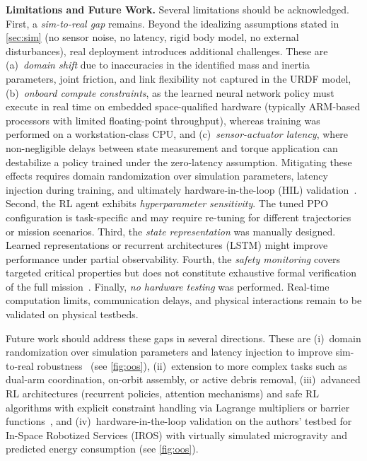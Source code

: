 \documentclass{ieeeaccess}
\begin{document}
\textbf{Limitations and Future Work.}
Several limitations should be acknowledged. First, a \emph{sim-to-real gap} remains. Beyond the idealizing assumptions
stated in \autoref{sec:sim} (no sensor noise, no latency, rigid body model, no external disturbances),
real deployment introduces additional challenges. These are (a)~\emph{domain shift} due to inaccuracies in the
identified mass and inertia parameters, joint friction, and link flexibility not captured in the
URDF model, (b)~\emph{onboard compute constraints}, as the learned neural network policy must execute in
real time on embedded space-qualified hardware (typically ARM-based processors with limited floating-point throughput), whereas
training was performed on a workstation-class CPU, and (c)~\emph{sensor-actuator latency}, where non-negligible delays between
state measurement and torque application can destabilize a policy trained under the zero-latency assumption.
Mitigating these effects requires domain randomization over simulation parameters, latency injection during training, and
ultimately hardware-in-the-loop (HIL) validation~\cite{b8,b22}.
Second, the RL agent exhibits \emph{hyperparameter sensitivity}. The tuned PPO configuration is task-specific and
may require re-tuning for different
trajectories or mission scenarios. Third, the \emph{state representation} was manually designed. Learned representations or
recurrent architectures (LSTM)
might improve performance under partial observability. Fourth, the \emph{safety monitoring} covers targeted critical properties
but does not constitute
exhaustive formal verification of the full mission~\cite{b5,b22}. Finally, \emph{no hardware testing} was performed. Real-time
computation limits,
communication delays, and physical interactions remain to be validated on physical testbeds.

Future work should address these gaps in several directions. These are (i)~domain randomization over
simulation parameters and latency injection to improve sim-to-real robustness~\cite{b8} (see \cref{fig:oos}), (ii)~extension to more
complex tasks such as dual-arm coordination, on-orbit assembly, or active debris removal, (iii)~advanced
RL architectures (recurrent policies, attention mechanisms) and safe RL algorithms with explicit constraint handling
via Lagrange multipliers
or barrier functions~\cite{b22,b24,b23,b34}, and (iv)~hardware-in-the-loop validation on the authors' testbed for In-Space Robotized Services
(IROS) with virtually simulated microgravity and predicted energy consumption (see \cref{fig:oos}).
\end{document}
